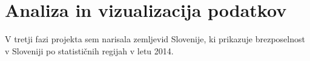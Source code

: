 \documentclass[11pt,a4paper]{article}
\begin{document}
\newpage

\section{Analiza in vizualizacija podatkov}

V tretji fazi projekta sem narisala zemljevid Slovenije, ki prikazuje brezposelnost v Sloveniji po statističnih regijah v letu 2014. 


% 
% 
\end{document}
